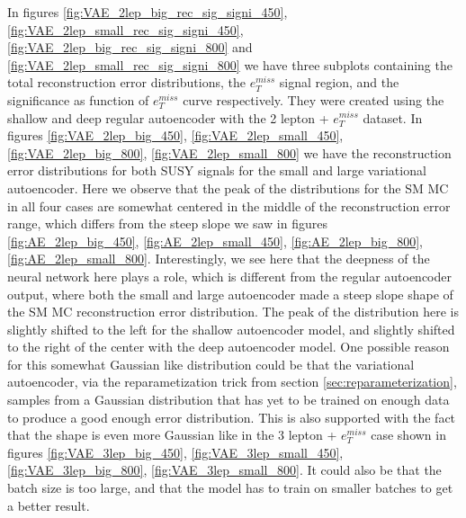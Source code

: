 In figures \ref{fig:VAE_2lep_big_rec_sig_signi_450}, \ref{fig:VAE_2lep_small_rec_sig_signi_450}, 
\ref{fig:VAE_2lep_big_rec_sig_signi_800} and \ref{fig:VAE_2lep_small_rec_sig_signi_800} we have three 
subplots containing the total reconstruction error distributions, the $e_T^{miss}$ signal region, 
and the significance as function of $e_T^{miss}$ curve respectively. They were created using 
the shallow and deep regular autoencoder with the 2 lepton + $e_T^{miss}$ dataset.
In figures \ref{fig:VAE_2lep_big_450}, \ref{fig:VAE_2lep_small_450}, \ref{fig:VAE_2lep_big_800}, 
\ref{fig:VAE_2lep_small_800} we have the reconstruction error distributions 
for both SUSY signals for the small and large variational autoencoder. Here we observe that the 
peak of the distributions for the SM MC in all four cases are somewhat centered in the middle 
of the reconstruction error range, which differs from the steep slope we saw in figures 
\ref{fig:AE_2lep_big_450}, \ref{fig:AE_2lep_small_450}, \ref{fig:AE_2lep_big_800}, 
\ref{fig:AE_2lep_small_800}. Interestingly, we see here that the deepness of the neural 
network here plays a role, which is different from the regular autoencoder output, where both 
the small and large autoencoder made a steep slope shape of the SM MC reconstruction error 
distribution. The peak of the distribution here is slightly shifted to the left for the shallow 
autoencoder model, and slightly shifted to the right of the center with the deep autoencoder 
model. One possible reason for this somewhat Gaussian like distribution could be that the 
variational autoencoder, via the reparametization trick from section \ref{sec:reparameterization}, 
samples from a Gaussian distribution that has yet to be trained on enough data to produce a 
good enough error distribution. This is also supported with the fact that the shape is even more 
Gaussian like in the 3 lepton + $e_T^{miss}$ case shown in figures \ref{fig:VAE_3lep_big_450}, 
\ref{fig:VAE_3lep_small_450}, \ref{fig:VAE_3lep_big_800}, \ref{fig:VAE_3lep_small_800}. 
It could also be that the batch size is too large, and that the model has to train on smaller 
batches to get a better result. \par 

